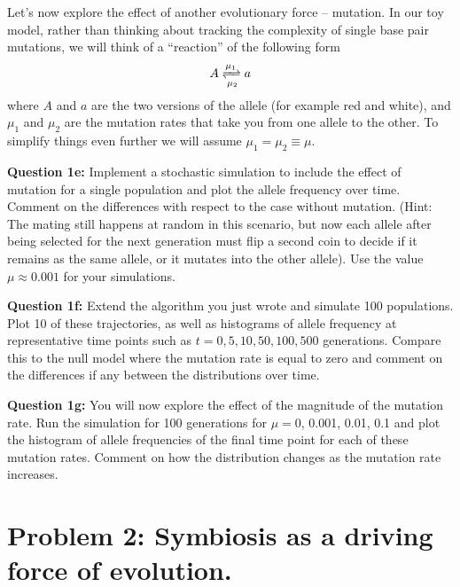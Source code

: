 \documentclass[12pt]{article}    %
\begin{document}
Let's now explore the effect of another evolutionary force -- mutation. In
our toy model, rather than thinking about tracking the complexity of single base
pair mutations, we will think of a ``reaction'' of the following form
\begin{equation}
A \xrightleftharpoons[\mu_2]{\mu_1} a
\end{equation}
where $A$ and $a$ are the two versions of the allele (for example red and
white), and $\mu_1$ and $\mu_2$ are the mutation rates that take you from one
allele to the other. To simplify things even further we will assume $\mu_1 =
\mu_2 \equiv \mu$.

\vspace{5mm}
\textbf{Question 1e:} Implement a stochastic simulation to include the effect of
mutation for a single population and plot the allele frequency over time.
Comment on the differences with respect to the case without mutation. (Hint: The
mating still happens at random in this scenario, but now each allele after being
selected for the next generation must flip a second coin to decide if it
remains as the same allele, or it mutates into the other allele). Use the value
$\mu \approx 0.001$ for your simulations.
\vspace{5mm}

\vspace{5mm}
\textbf{Question 1f:} Extend the algorithm you just wrote and simulate 100
populations. Plot 10 of these trajectories, as well as histograms of allele
frequency at representative time points such as $t = 0, 5, 10, 50, 100, 500$
generations. Compare this to the null model where the mutation rate is equal
to zero and comment on the differences if any between the distributions over
time.
\vspace{5mm}

\vspace{5mm}
\textbf{Question 1g:} You will now explore the effect of the magnitude of the
mutation rate. Run the simulation for 100 generations for $\mu =$0,  0.001,
0.01, 0.1 and plot the histogram of allele frequencies of the final time point
for each of these mutation rates. Comment on how the distribution changes as the
mutation rate increases.
\vspace{5mm}


\clearpage

\section{Problem 2: Symbiosis as a driving force of evolution.}
\end{document}
